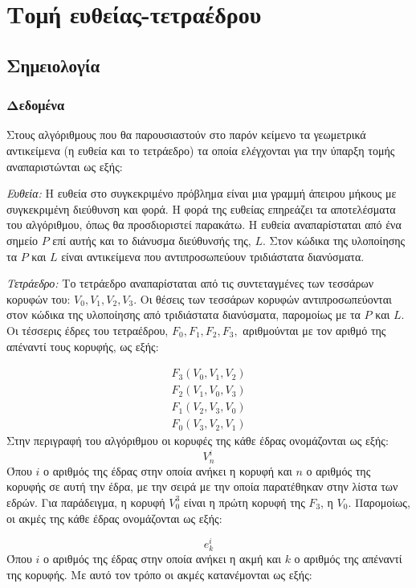 \chapter{Τομή ευθείας-τετραέδρου}
\label{chapter:algs}
\section{Σημειολογία}
\subsection{Δεδομένα}
\label{chapter:alginput}
\noindent Στους αλγόριθμους που θα παρουσιαστούν στο παρόν κείμενο τα γεωμετρικά αντικείμενα (η ευθεία και το τετράεδρο) τα οποία ελέγχονται για την ύπαρξη τομής αναπαριστώνται ως εξής:

\emph{Ευθεία:} Η ευθεία στο συγκεκριμένο πρόβλημα είναι μια γραμμή άπειρου μήκους με συγκεκριμένη διεύθυνση και φορά. Η φορά της ευθείας επηρεάζει τα αποτελέσματα του αλγόριθμου, όπως θα προσδιοριστεί παρακάτω. Η ευθεία αναπαρίσταται από ένα σημείο $P$ επί αυτής και το διάνυσμα διεύθυνσής της, $L$. Στον κώδικα της υλοποίησης τα $P$ και $L$ είναι αντικείμενα που αντιπροσωπεύουν τριδιάστατα διανύσματα.  

\emph{Τετράεδρο:} Το τετράεδρο αναπαρίσταται από τις συντεταγμένες των τεσσάρων κορυφών του: $V_0,V_1,V_2,V_3$. Οι θέσεις των τεσσάρων κορυφών αντιπροσωπεύονται στον κώδικα της υλοποίησης από τριδιάστατα διανύσματα, παρομοίως με τα $P$ και $L$. Οι τέσσερις έδρες του τετραέδρου, $F_0,F_1,F_2,F_3,$ αριθμούνται με τον αριθμό της απέναντί τους κορυφής, ως εξής:

\begin{eqnarray*}
F_3 (V_0,V_1,V_2)\\	
F_2 (V_1,V_0,V_3)\\	
F_1 (V_2,V_3,V_0)\\		
F_0 (V_3,V_2,V_1)
\end{eqnarray*}
Στην περιγραφή του αλγόριθμου οι κορυφές της κάθε έδρας ονομάζονται ως εξής:\\
\begin{equation*}
 V^i_n
\end{equation*}
Όπου $i$ ο αριθμός της έδρας στην οποία ανήκει η κορυφή και $n$ ο αριθμός της κορυφής σε αυτή την έδρα, με την σειρά με την οποία παρατέθηκαν στην λίστα των εδρών. Για παράδειγμα, η κορυφή $V^3_0$  είναι η πρώτη  κορυφή της $F_3$, η $V_0$. Παρομοίως, οι ακμές της κάθε έδρας ονομάζονται ως εξής:

\begin{equation*}
e^i_k
\end{equation*}
Όπου $i$ ο αριθμός της έδρας στην οποία ανήκει η ακμή και $k$ ο αριθμός της απέναντί της κορυφής. Με αυτό τον τρόπο οι ακμές κατανέμονται ως εξής:

